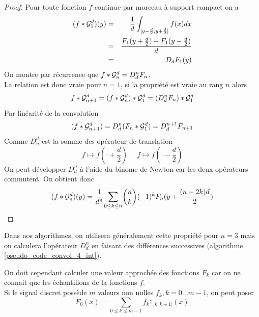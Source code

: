 \begin{proof}
Pour toute fonction $f$ continue par morceau à support compact on a 
\begin{eqnarray*}
(f * \mathcal{G}_1^d )(y)&=&\frac{1}{d} \int_{[y-\frac{d}{2},y+\frac{d}{2}]} f(x) dx\\
               &=&\frac{F_{1}(y+\frac{d}{2})-F_{1}(y-\frac{d}{2})}{d}\\
               &=&D_d F_{1}(y)
\end{eqnarray*}
On montre par récurrence que $ f*\mathcal{G}_n^d=D_d^n F_{n}$.\\
La relation est donc vraie pour $n=1$, si la propriété est vraie au rang $n$ alors
\begin{equation*}
f*\mathcal{G}_{n+1}^{d}=(f * \mathcal{G}_{n}^d) * \mathcal{G}_{1}^{d}= (D_d^n F_{n})*\mathcal{G}_1^d 
\end{equation*}
Par linéarité de la convolution
\begin{equation*}
(f*\mathcal{G}_{n+1}^{d}) = D_d^n (F_{n}*\mathcal{G}_1^d) = D_d^{n+1} F_{n+1}
\end{equation*}
Comme $D_n^d$ est la somme des opérateur de translation
\begin{equation*}
f\mapsto f(\cdot+\frac{d}{2})~~~~~~f\mapsto f(\cdot-\frac{d}{2})
\end{equation*}
On peut développer $D_d^n$ à l'aide du binome de Newton car les deux opérateurs commutent. On obtient donc
\begin{equation*}
(f*\mathcal{G}_n^d)(y) = \frac{1}{d^n}\underset{0 \le k\le n}{\sum} \binom{n}{k}(-1)^{k} F_{n}(y+\frac{(n-2k)d}{2})
\end{equation*}

\end{proof}
Dans nos algorithmes, on utilisera généralement cette propriété pour $n=3$ mais on calculera l'opérateur $D_d^n$ en faisant des différences successives (algorithme \ref{pseudo_code_convol_4_int}).

On doit cependant calculer une valeur approchée des fonctions $F_{k}$  car on ne connait que les échantillons de la fonctions $f$.\\
Si le signal discret possède $m$ valeurs non nulles $f_k,k=0...m-1$, on peut poser 
\begin{equation*}
F_{0} (x) =\underset{0\le k \le m-1}{\sum}f_{k} \mathds{1}_{[k,k+1[}(x)
\end{equation*}


